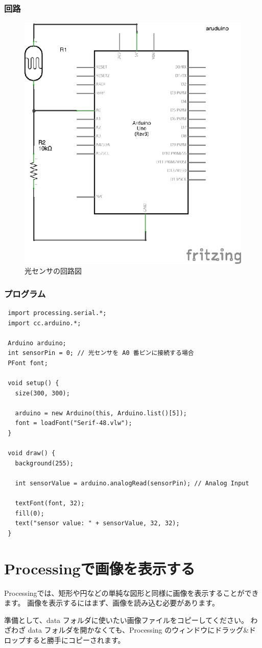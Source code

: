 \documentclass[11pt,a4paper]{jarticle}
\begin{document}
\subsubsection*{回路}
\begin{figure}[h!]
 \centering
 \includegraphics[width=0.4\columnwidth]{img/light_sensor_circuit.eps}
 \caption{光センサの回路図}
\end{figure}


\subsubsection*{プログラム}
\begin{lstlisting}
 import processing.serial.*;
 import cc.arduino.*;
 
 Arduino arduino;
 int sensorPin = 0; // 光センサを A0 番ピンに接続する場合
 PFont font;
 
 void setup() {
   size(300, 300);

   arduino = new Arduino(this, Arduino.list()[5]);
   font = loadFont("Serif-48.vlw");
 }

 void draw() {
   background(255);

   int sensorValue = arduino.analogRead(sensorPin); // Analog Input

   textFont(font, 32);
   fill(0);
   text("sensor value: " + sensorValue, 32, 32);
 }
\end{lstlisting}


\section{Processingで画像を表示する}
Processingでは、矩形や円などの単純な図形と同様に画像を表示することができます。
画像を表示するにはまず、画像を読み込む必要があります。

準備として、data フォルダに使いたい画像ファイルをコピーしてください。
わざわざ data フォルダを開かなくても、Processing のウィンドウにドラッグ\&ドロップすると勝手にコピーされます。
\end{document}

